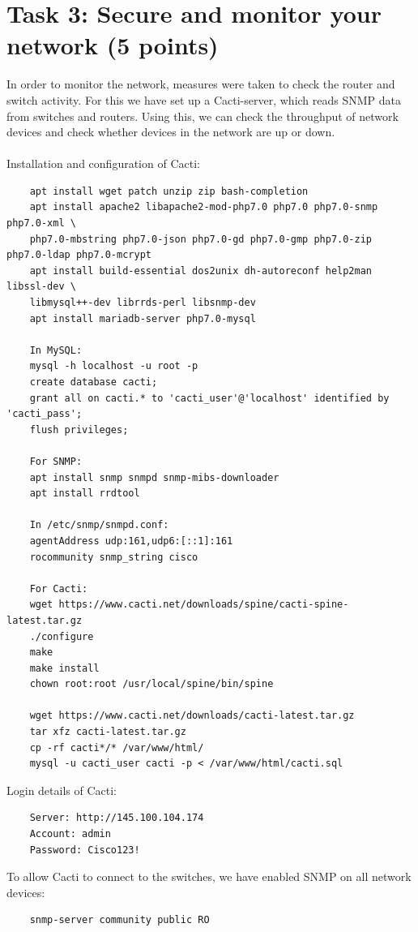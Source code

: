 \documentclass[10pt,a4paper]{article}
\begin{document}
\section{Task 3: Secure and monitor your network (5 points)}
In order to monitor the network, measures were taken to check the router and switch activity. For this we have set up a Cacti-server, which reads SNMP data from switches and routers. Using this, we can check the throughput of network devices and check whether devices in the network are up or down.\\
\\
Installation and configuration of Cacti:
\begin{verbatim}
    apt install wget patch unzip zip bash-completion
    apt install apache2 libapache2-mod-php7.0 php7.0 php7.0-snmp php7.0-xml \
    php7.0-mbstring php7.0-json php7.0-gd php7.0-gmp php7.0-zip php7.0-ldap php7.0-mcrypt
    apt install build-essential dos2unix dh-autoreconf help2man libssl-dev \
    libmysql++-dev librrds-perl libsnmp-dev
    apt install mariadb-server php7.0-mysql
    
    In MySQL:
    mysql -h localhost -u root -p
    create database cacti;
    grant all on cacti.* to 'cacti_user'@'localhost' identified by 'cacti_pass';
    flush privileges;
    
    For SNMP:
    apt install snmp snmpd snmp-mibs-downloader
    apt install rrdtool
    
    In /etc/snmp/snmpd.conf:
    agentAddress udp:161,udp6:[::1]:161
    rocommunity snmp_string cisco
    
    For Cacti:
    wget https://www.cacti.net/downloads/spine/cacti-spine-latest.tar.gz
    ./configure
    make
    make install
    chown root:root /usr/local/spine/bin/spine
    
    wget https://www.cacti.net/downloads/cacti-latest.tar.gz
    tar xfz cacti-latest.tar.gz
    cp -rf cacti*/* /var/www/html/
    mysql -u cacti_user cacti -p < /var/www/html/cacti.sql
\end{verbatim}

Login details of Cacti:
\begin{verbatim}
    Server: http://145.100.104.174
    Account: admin
    Password: Cisco123!
\end{verbatim}

To allow Cacti to connect to the switches, we have enabled SNMP on all network devices:
\begin{verbatim}
    snmp-server community public RO
\end{verbatim}
\end{document}

